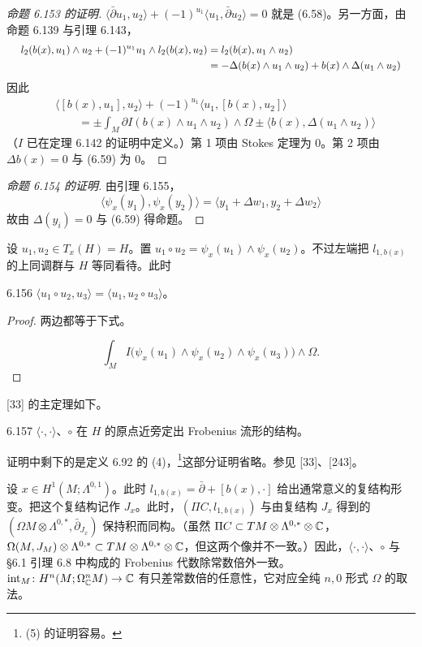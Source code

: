 \begin{proof}[命题 6.153 的证明]
  $\langle\bar\partial u_1,u_2\rangle+(-1)^{u_1}\langle u_1,\bar\partial u_2\rangle=0$ 就是 (6.58)。另一方面，由命题 6.139 与引理 6.143，
\[
  \resizebox{0.97\linewidth}{!}{$\begin{aligned} l_2(b(x),u_1)\wedge u_2+(-1)^{u_1}u_1\wedge l_2(b(x),u_2) &=l_2(b(x),u_1\wedge u_2)\\ &=-\Delta(b(x)\wedge u_1\wedge u_2)+b(x)\wedge\Delta(u_1\wedge u_2) \end{aligned}$}
\]
  因此
  \begin{align*}
    &\langle[b(x),u_1],u_2\rangle+(-1)^{u_1}\langle u_1,[b(x),u_2]\rangle\\
    &\qquad=\pm\int_M\partial I(b(x)\wedge u_1\wedge u_2)\wedge\Omega
    \pm\langle b(x),\Delta(u_1\wedge u_2)\rangle
  \end{align*}
  （$I$ 已在定理 6.142 的证明中定义。）第 1 项由 Stokes 定理为 0。第 2 项由 $\Delta b(x)=0$ 与 (6.59) 为 0。
\end{proof}

\begin{proof}[命题 6.154 的证明]
  由引理 6.155，
  \[
    \langle\psi_x(y_1),\psi_x(y_2)\rangle=\langle y_1+\Delta w_1,y_2+\Delta w_2\rangle
  \]
  故由 $\Delta(y_i)=0$ 与 (6.59) 得命题。
\end{proof}

设 $u_1,u_2\in T_x(H)=H$。置 $u_1\circ u_2=\psi_x(u_1)\wedge\psi_x(u_2)$。不过左端把 $l_{1,b(x)}$ 的上同调群与 $H$ 等同看待。此时

\begin{lemma*}{6.156}
  $\langle u_1\circ u_2,u_3\rangle=\langle u_1,u_2\circ u_3\rangle$。
\end{lemma*}

\begin{proof}
  两边都等于下式。

  \[
    \int_MI\bigl(\psi_x(u_1)\wedge\psi_x(u_2)\wedge\psi_x(u_3)\bigr)\wedge\Omega.
  \]
\end{proof}

[33] 的主定理如下。

\begin{theorem}{6.157}
  $\langle\cdot,\cdot\rangle$、$\circ$ 在 $H$ 的原点近旁定出 Frobenius 流形的结构。
\end{theorem}

证明中剩下的是定义 6.92 的 (4)，\footnote{(5) 的证明容易。}这部分证明省略。参见 [33]、[243]。

设 $x\in H^1(M;\Lambda^{0,1})$。此时 $l_{1,b(x)}=\bar\partial+[b(x),\cdot]$ 给出通常意义的复结构形变。把这个复结构记作 $J_x$。此时，$(\Pi C,l_{1,b(x)})$ 与由复结构 $J_x$ 得到的 $(\Omega M\otimes\Lambda^{0,*},\bar\partial_{J_x})$ 保持积而同构。（虽然 $\Pi C\subset TM\otimes\Lambda^{0,*}\otimes\mathbb{C}$，$\Omega(M,J_M)\otimes\Lambda^{0,*}\subset TM\otimes\Lambda^{0,*}\otimes\mathbb{C}$，但这两个像并不一致。）因此，$\langle\cdot,\cdot\rangle$、$\circ$ 与 §6.1 引理 6.8 中构成的 Frobenius 代数除常数倍外一致。$\mathrm{int}_M\colon H^n(M;\Omega^n_{\mathbb{C}}M)\to\mathbb{C}$ 有只差常数倍的任意性，它对应全纯 $n,0$ 形式 $\Omega$ 的取法。

